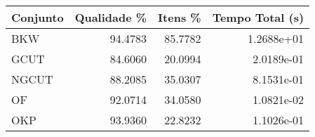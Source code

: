 \begin{tabular}{lrrr}
    \hline
    Conjunto & Qualidade \% & Itens \% & Tempo Total (s) \\
    \hline
    BKW      & 94.4783      & 85.7782  & 1.2688e+01      \\
    GCUT     & 84.6060      & 20.0994  & 2.0189e-01      \\
    NGCUT    & 88.2085      & 35.0307  & 8.1531e-01      \\
    OF       & 92.0714      & 34.0580  & 1.0821e-02      \\
    OKP      & 93.9360      & 22.8232  & 1.1026e-01      \\
    \hline
\end{tabular}